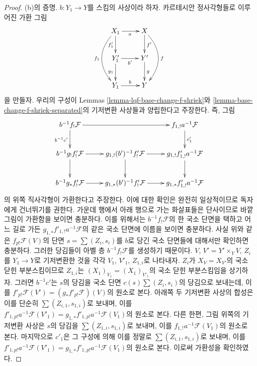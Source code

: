 \begin{proof}
\medskip\noindent
(b)의 증명. $b : Y_1 \to Y$를 스킴의 사상이라 하자. 카르테시안
정사각형들로 이루어진 가환 그림
$$
\xymatrix{
X_1 \ar[d]_{f'_1} \ar[r]_a \ar@/_2em/[dd]_{f_1} &
X \ar[d]^{f'} \ar@/^2em/[dd]^f \\
Y'_1 \ar[d]_{g_1} \ar[r]_{b'} &
Y' \ar[d]^g \\
Y_1 \ar[r]^b &
Y
}
$$
을 만들자. 우리의 구성이 Lemmas
\ref{lemma-lqf-base-change-f-shriek}와
\ref{lemma-base-change-f-shriek-separated}의 기저변환 사상들과
양립한다고 주장한다. 즉, 그림
$$
\xymatrix{
b^{-1}f_!\mathcal{F} \ar[rr] \ar[d]_{b^{-1}c'} & &
f_{1, !}a^{-1}\mathcal{F} \ar[d]^{c_1'} \\
b^{-1}g_!f'_!\mathcal{F} \ar[r] \ar[d] &
g_{1, !}(b')^{-1}f'_!\mathcal{F} \ar[r] \ar[d] &
g_{1, !}f'_{1, !}a^{-1}\mathcal{F} \ar[d] \\
b^{-1}g_*f'_!\mathcal{F} \ar[r] &
g_{1, *}(b')^{-1}f'_!\mathcal{F} \ar[r] &
g_{1, *}f'_{1, !}a^{-1}\mathcal{F}
}
$$
의 위쪽 직사각형이 가환한다고 주장한다. 이에 대한 확인은 완전히
일상적이므로 독자에게 건너뛰기를 권한다. 가운데 행에서 아래 행으로
가는 화살표들은 단사이므로 바깥 그림이 가환함을 보이면 충분하다.
이를 위해서는 $b^{-1}f_!\mathcal{F}$의 한 국소 단면을 택하고 어느
길로 가든 $g_{1, *}f'_{1, !}a^{-1}\mathcal{F}$의 같은 국소 단면에
이름을 보이면 충분하다. 사실 위와 같은
$f_{p!}\mathcal{F}(V)$의 단면 $s = \sum (Z_i, s_i)$를 $b$로 당긴
국소 단면들에 대해서만 확인하면 충분하다. 그러한 당김들이 아벨 층
$b^{-1}f_!\mathcal{F}$를 생성하기 때문이다. $V$,
$V' = Y' \times_Y V$, $Z_i$를 $Y_1 \to Y$로 기저변환한 것을 각각
$V_1$, $V'_1$, $Z_{1, i}$로 나타내자.
$Z_i$가 $X_V = X_{V'}$의 국소 닫힌 부분스킴이므로
$Z_{1, i}$는 $(X_1)_{V_1} = (X_1)_{V'_1}$의 국소 닫힌
부분스킴임을 상기하자. 그러면
$b^{-1}c'$는 $s$의 당김을 국소 단면 $c(s) \sum (Z_i, s_i)$의
당김으로 보내는데, 이를
$f'_{p!}\mathcal{F}(V') = (g_*f'_{p!}\mathcal{F})(V)$의 원소로 본다.
아래쪽 두 기저변환 사상의 합성은 이를 단순히
$\sum (Z_{i, 1}, s_{1, i})$로 보내며, 이를
$f'_{1, p!}a^{-1}\mathcal{F}(V'_1) =
g_{1, *}f'_{1, p!}a^{-1}\mathcal{F}(V_1)$의 원소로 본다.
다른 한편, 그림 위쪽의 기저변환 사상은 $s$의 당김을
$\sum (Z_{1, i}, s_{1, i})$로 보내며, 이를
$f_{1, !}a^{-1}\mathcal{F}(V_1)$의 원소로 본다. 마지막으로
$c'_1$은 그 구성에 의해 이를 정말로
$\sum (Z_{i, 1}, s_{1, i})$로 보내며, 이를
$f'_{1, p!}a^{-1}\mathcal{F}(V'_1) =
g_{1, *}f'_{1, p!}a^{-1}\mathcal{F}(V_1)$의 원소로 본다.
이로써 가환성을 확인하였다.


\end{proof}

